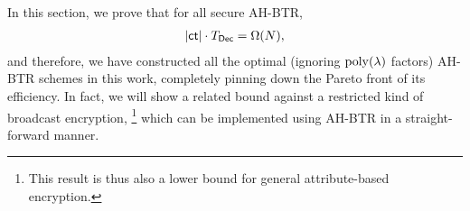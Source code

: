 In this section, we prove that for all secure AH-BTR,
\begin{align*}
|\ct|\cdot\TDec=\bigOmega(N),
\end{align*}
and therefore, we have constructed all the optimal (ignoring $\operatorname{poly}(\lambda)$ factors) AH-BTR schemes in this work, completely pinning down the Pareto front of its efficiency.
In fact, we will show a related bound against a restricted kind of broadcast encryption,%
\footnote{This result is thus also a lower bound for general attribute-based encryption.}
which can be implemented using AH-BTR in a straight-forward manner.

